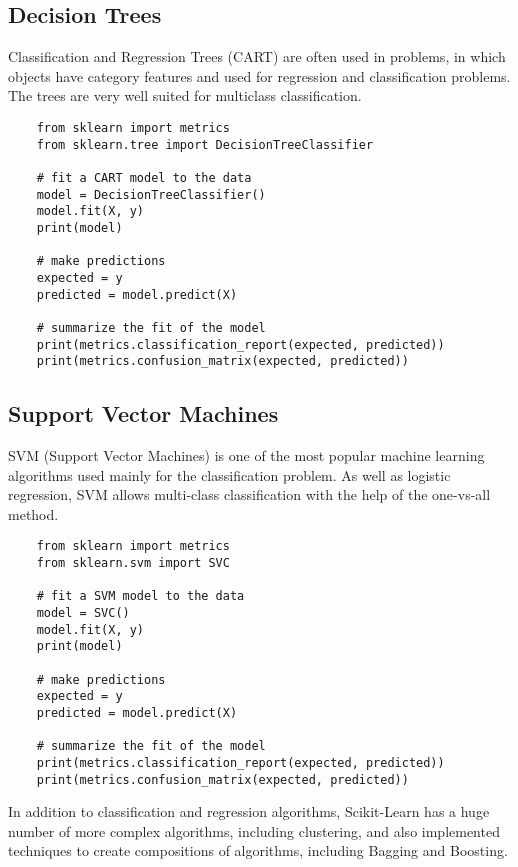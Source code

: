 \documentclass[a4paper,12pt]{article}
\begin{document}
\subsection{Decision Trees}
Classification and Regression Trees (CART) are often used in problems, in which objects have category features and used for regression and classification problems. The trees are very well suited for multiclass classification.

\begin{framed}
	\begin{verbatim}
	from sklearn import metrics
	from sklearn.tree import DecisionTreeClassifier
	
	# fit a CART model to the data
	model = DecisionTreeClassifier()
	model.fit(X, y)
	print(model)
	
	# make predictions
	expected = y
	predicted = model.predict(X)
	
	# summarize the fit of the model
	print(metrics.classification_report(expected, predicted))
	print(metrics.confusion_matrix(expected, predicted))
	\end{verbatim}
\end{framed}
\newpage
\subsection{Support Vector Machines}
SVM (Support Vector Machines) is one of the most popular machine learning algorithms used mainly for the classification problem. As well as logistic regression, SVM allows multi-class classification with the help of the one-vs-all method.

\begin{framed}
	\begin{verbatim}
	from sklearn import metrics
	from sklearn.svm import SVC
	
	# fit a SVM model to the data
	model = SVC()
	model.fit(X, y)
	print(model)
	
	# make predictions
	expected = y
	predicted = model.predict(X)
	
	# summarize the fit of the model
	print(metrics.classification_report(expected, predicted))
	print(metrics.confusion_matrix(expected, predicted))
	\end{verbatim}
\end{framed}
In addition to classification and regression algorithms, Scikit-Learn has a huge number of more complex algorithms, including clustering, and also implemented techniques to create compositions of algorithms, including Bagging and Boosting.
\end{document}
